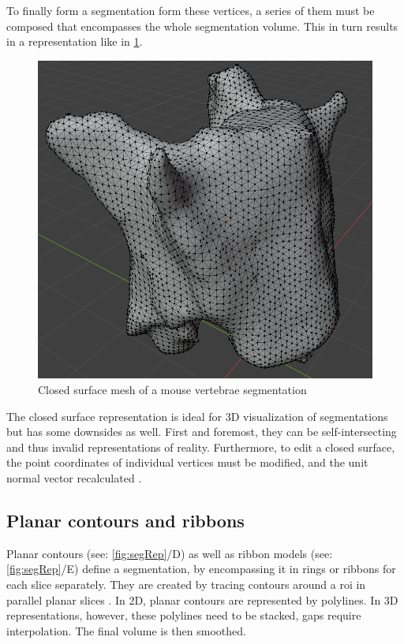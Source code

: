 \noindent
To finally form a segmentation form these vertices, a series of them must be composed that encompasses the whole segmentation volume.
This in turn results in a representation like in \cref{fig:spineMesh}.
\begin{figure}[h]
	\centerline{
		\includegraphics[scale=0.355]{images/spineMesh.png}}
	\caption{Closed surface mesh of a mouse vertebrae segmentation}\label{fig:spineMesh}
\end{figure}

\noindent
The closed surface representation is ideal for 3D visualization of segmentations but has some downsides as well.
First and foremost, they can be self-intersecting and thus invalid representations of reality.
Furthermore, to edit a closed surface, the point coordinates of individual vertices must be modified,
and the unit normal vector recalculated \cite{pinterPolymorphSegmentationRepresentation2019}.


\subsection{Planar contours and ribbons}\label{s:b-planar-contours}
Planar contours (see: \cref{fig:segRep}/D) as well as ribbon models (see: \cref{fig:segRep}/E) define a segmentation,
by encompassing it in rings or ribbons for each slice separately.
They are created by tracing contours around a \acrfull{roi} in parallel planar slices \cite{pinterPolymorphSegmentationRepresentation2019,weinsteinScanlineSurfacingBuilding2000}.
In 2D, planar contours are represented by polylines.
In 3D representations, however, these polylines need to be stacked, gaps require interpolation.
The final volume is then smoothed.

